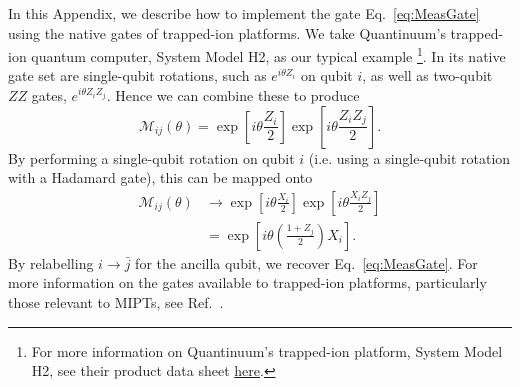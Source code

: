 \documentclass[reprint,amsmath,amssymb,aps, twocolumn, superscriptaddress, prb]{revtex4-2}
\begin{document}
In this Appendix, we describe how to implement the gate Eq.~\eqref{eq:MeasGate} using the native gates of trapped-ion platforms. We take Quantinuum's trapped-ion quantum computer, System Model H2, as our typical example \footnote{\label{eq:Quantinuum}For more information on Quantinuum's trapped-ion platform, System Model H2, see their product data sheet \href{https://www.quantinuum.com/products-solutions/quantinuum-systems/system-model-h2}{here}.}. In its native gate set are single-qubit rotations, such as $e^{i\theta Z_i}$ on qubit $i$, as well as two-qubit $ZZ$ gates, $e^{i \theta Z_i Z_j}$. Hence we can combine these to produce
%
\begin{equation}
  \mathcal{M}_{ij}(\theta) = \exp[i\theta \frac{Z_i}{2}] \exp[i\theta \frac{Z_i Z_j}{2}].
\end{equation}
%
By performing a single-qubit rotation on qubit $i$ (i.e. using a single-qubit rotation with a Hadamard gate), this can be mapped onto
%
\begin{align}
  \mathcal{M}_{ij}(\theta) &\to \exp[i\theta \frac{X_i}{2}] \exp[i\theta \frac{X_i Z_j}{2}] \\
  &= \exp[i\theta \left(\frac{1 + Z_j}{2}\right)X_i].
\end{align}
%
By relabelling $i \to \bar{j}$ for the ancilla qubit, we recover Eq.~\eqref{eq:MeasGate}. For more information on the gates available to trapped-ion platforms, particularly those relevant to MIPTs, see Ref.~\cite{MelkoPRA2021}.


\end{document}

